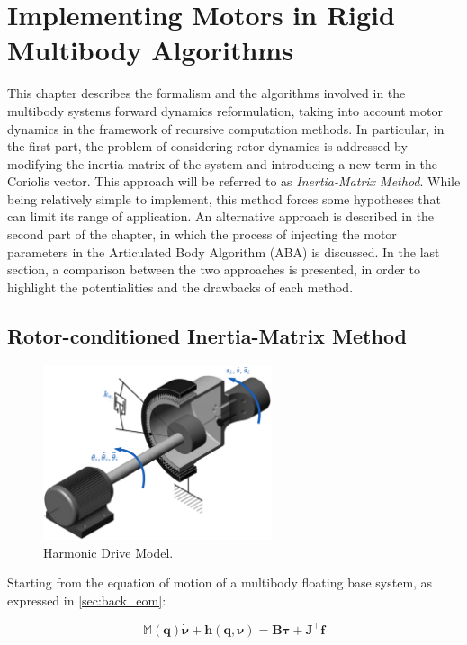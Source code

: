 \chapter{Implementing Motors in Rigid Multibody Algorithms}
\label{chp:contrib_ABA}

This chapter describes the formalism and the algorithms involved in the multibody systems forward dynamics reformulation, taking into account motor dynamics in the framework of recursive computation methods. In particular, in the first part, the problem of considering rotor dynamics is addressed by modifying the inertia matrix of the system and introducing a new term in the Coriolis vector. This approach will be referred to as \textit{Inertia-Matrix Method}. While being relatively simple to implement, this method forces some hypotheses that can limit its range of application. An alternative approach is described in the second part of the chapter, in which the process of injecting the motor parameters in the Articulated Body Algorithm (\ac{ABA}) is discussed. In the last section, a comparison between the two approaches is presented, in order to highlight the potentialities and the drawbacks of each method.

\section{Rotor-conditioned Inertia-Matrix Method}

\begin{figure}
    \centering
    \caption{Harmonic Drive Model.}
    \label{fig:harmonic_drive}
    \includegraphics[width=0.6\textwidth]{Images/harmonic_drive.png}
\end{figure}

Starting from the equation of motion of a multibody floating base system, as expressed in \cref{sec:back_eom}:

\begin{equation}
    \mathbb{M}(\mathbf{q})\dot{\boldsymbol{\nu}} + \mathbf{h}(\mathbf{q},\boldsymbol{\nu}) = \mathbf{B}\boldsymbol{\tau} + \mathbf{J} ^\top \mathbf{f}
\end{equation}

